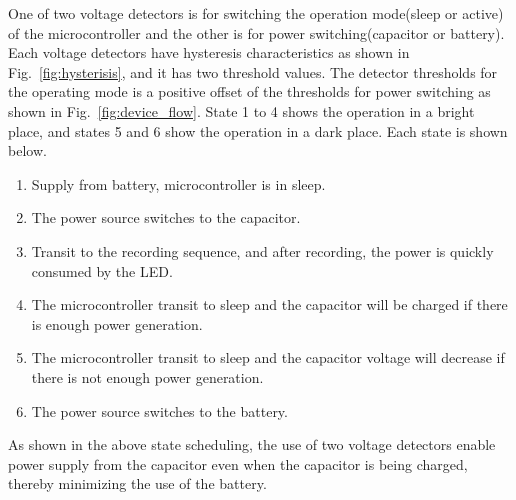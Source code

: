 \documentclass[conference]{IEEEtran}
\begin{document}
One of two voltage detectors is for switching the operation mode(sleep or active) of the microcontroller and the other is for power switching(capacitor or battery).
Each voltage detectors have hysteresis characteristics as shown in Fig.~\ref{fig:hysterisis}, and it has two threshold values.
The detector thresholds for the operating mode is a positive offset of the thresholds for power switching as shown in Fig.~\ref{fig:device_flow}.
State 1 to 4 shows the operation in a bright place, and states 5 and 6 show the operation in a dark place.
Each state is shown below.
\begin{enumerate}
    \renewcommand{\labelenumi}{\textcircled{\scriptsize \theenumi}}
    \item Supply from battery, microcontroller is in sleep.
    \item The power source switches to the capacitor.
    \item Transit to the recording sequence, and after recording, the power is quickly consumed by the LED.
    \item The microcontroller transit to sleep and the capacitor will be charged if there is enough power generation.
    \item The microcontroller transit to sleep and the capacitor voltage will decrease if there is not enough power generation.
    \item The power source switches to the battery.
\end{enumerate}
As shown in the above state scheduling, the use of two voltage detectors enable power supply from the capacitor even when the capacitor is being charged, thereby minimizing the use of the battery.
\end{document}
